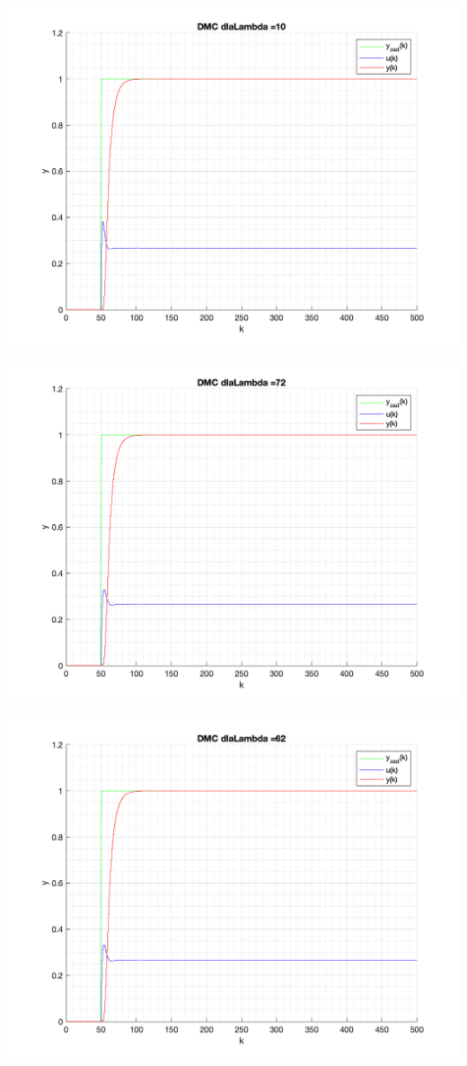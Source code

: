 \documentclass[a4paper, 11pt]{article}
\begin{document}
\begin{enumerate}
 \includegraphics[width=\linewidth]{./ModelsP4_Lambda/P4_DMC_Lambda_10_png.png} 
 
 \includegraphics[width=\linewidth]{./ModelsP4_Lambda/P4_DMC_Lambda_72_png.png} 
 
 \includegraphics[width=\linewidth]{./ModelsP4_Lambda/P4_DMC_Lambda_62_png.png} 
 

\end{enumerate}
\end{document}

